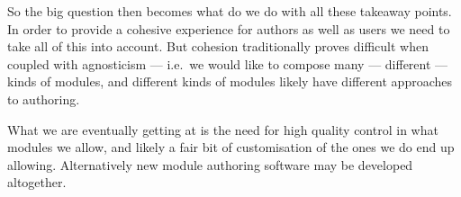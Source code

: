 So the big question then becomes what do we do with all these takeaway points. 
In order to provide a cohesive experience for authors as well as users we need 
to take all of this into account. But cohesion traditionally proves difficult 
when coupled with agnosticism --- i.e.\ we would like to compose many --- 
different --- kinds of modules, and different kinds of modules likely have 
different approaches to authoring.

What we are eventually getting at is the need for high quality control in what 
modules we allow, and likely a fair bit of customisation of the ones we do end 
up allowing. Alternatively new module authoring software may be developed 
altogether.
